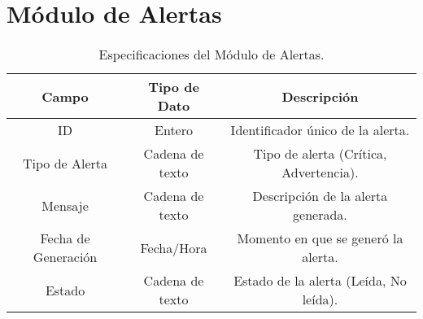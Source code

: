 \section{Módulo de Alertas}
\begin{table}[h!]
    \centering
    \begin{tabular}{|c|c|c|}
    \hline
    \rowcolor[HTML]{FCE8B2} 
    \textbf{Campo} & \textbf{Tipo de Dato} & \textbf{Descripción} \\ \hline
    ID & Entero & Identificador único de la alerta. \\ \hline
    Tipo de Alerta & Cadena de texto & Tipo de alerta (Crítica, Advertencia). \\ \hline
    Mensaje & Cadena de texto & Descripción de la alerta generada. \\ \hline
    Fecha de Generación & Fecha/Hora & Momento en que se generó la alerta. \\ \hline
    Estado & Cadena de texto & Estado de la alerta (Leída, No leída). \\ \hline
    \end{tabular}
    \caption{Especificaciones del Módulo de Alertas.}
\end{table}

